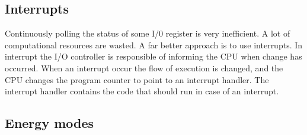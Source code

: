 \subsection{Interrupts}\label{ch:interrupts}
Continuously polling the status of some I/0 register is very inefficient. A lot of computational resources are wasted. A far better approach is to use interrupts. In interrupt the I/O controller is responsible of informing the CPU when change has occurred. When an interrupt occur the flow of execution is changed, and the CPU changes the program counter to point to an interrupt handler. The interrupt handler contains the code that should run in case of an interrupt.  


\subsection{Energy modes}\label{ch:energy_modes} 






